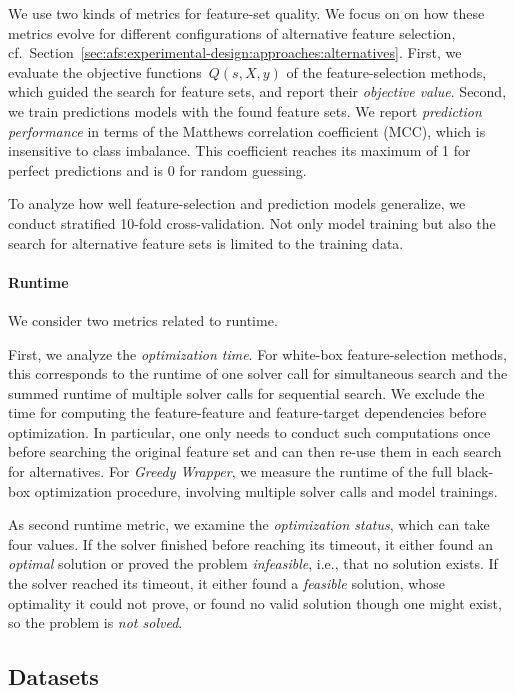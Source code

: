 \documentclass{article}
\theoremstyle{definition}
\begin{document}
We use two kinds of metrics for feature-set quality.
We focus on on how these metrics evolve for different configurations of alternative feature selection, cf.~Section~\ref{sec:afs:experimental-design:approaches:alternatives}.
First, we evaluate the objective functions~$Q(s,X,y)$ of the feature-selection methods, which guided the search for feature sets, and report their \emph{objective value}.
Second, we train predictions models with the found feature sets.
We report \emph{prediction performance} in terms of the Matthews correlation coefficient (MCC), which is insensitive to class imbalance.
This coefficient reaches its maximum of 1 for perfect predictions and is 0 for random guessing.

To analyze how well feature-selection and prediction models generalize, we conduct stratified 10-fold cross-validation.
Not only model training but also the search for alternative feature sets is limited to the training data.

\paragraph{Runtime}

We consider two metrics related to runtime.

First, we analyze the \emph{optimization time}.
For white-box feature-selection methods, this corresponds to the runtime of one solver call for simultaneous search and the summed runtime of multiple solver calls for sequential search.
We exclude the time for computing the feature-feature and feature-target dependencies before optimization.
In particular, one only needs to conduct such computations once before searching the original feature set and can then re-use them in each search for alternatives.
For \emph{Greedy Wrapper}, we measure the runtime of the full black-box optimization procedure, involving multiple solver calls and model trainings.

As second runtime metric, we examine the \emph{optimization status}, which can take four values.
If the solver finished before reaching its timeout, it either found an \emph{optimal} solution or proved the problem \emph{infeasible}, i.e., that no solution exists.
If the solver reached its timeout, it either found a \emph{feasible} solution, whose optimality it could not prove, or found no valid solution though one might exist, so the problem is \emph{not solved}.

\subsection{Datasets}
\label{sec:afs:experimental-design:datasets}
\end{document}
